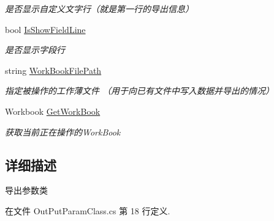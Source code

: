 \begin{DoxyCompactItemize}
\begin{DoxyCompactList}\small\item\em 是否显示自定义文字行（就是第一行的导出信息） \end{DoxyCompactList}\item 
bool \hyperlink{class_x_c_l_net_tools_1_1_entity_1_1_office_1_1_excel_handler_1_1_out_put_param_class_a6003391938fd21744be4f6bb16cf89d9}{Is\-Show\-Field\-Line}
\begin{DoxyCompactList}\small\item\em 是否显示字段行 \end{DoxyCompactList}\item 
string \hyperlink{class_x_c_l_net_tools_1_1_entity_1_1_office_1_1_excel_handler_1_1_out_put_param_class_a5b29724ec341728c000b509ec1a5e5bc}{Work\-Book\-File\-Path}
\begin{DoxyCompactList}\small\item\em 指定被操作的工作薄文件 （用于向已有文件中写入数据并导出的情况） \end{DoxyCompactList}\item 
Workbook \hyperlink{class_x_c_l_net_tools_1_1_entity_1_1_office_1_1_excel_handler_1_1_out_put_param_class_a953f3019c51e0fff8f6ec14dbe3cc10d}{Get\-Work\-Book}
\begin{DoxyCompactList}\small\item\em 获取当前正在操作的\-Work\-Book \end{DoxyCompactList}\end{DoxyCompactItemize}


\subsection{详细描述}
导出参数类 



在文件 Out\-Put\-Param\-Class.\-cs 第 18 行定义.



